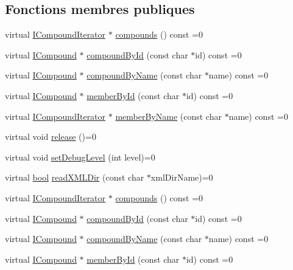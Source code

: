 \subsection*{Fonctions membres publiques}
\begin{DoxyCompactItemize}
\item 
virtual \hyperlink{class_i_compound_iterator}{I\+Compound\+Iterator} $\ast$ \hyperlink{class_i_doxygen_ad6bef278ea486b463323b2be87990a67}{compounds} () const  =0
\item 
virtual \hyperlink{class_i_compound}{I\+Compound} $\ast$ \hyperlink{class_i_doxygen_a797d66e139fe7638e27d917d97c9087c}{compound\+By\+Id} (const char $\ast$id) const  =0
\item 
virtual \hyperlink{class_i_compound}{I\+Compound} $\ast$ \hyperlink{class_i_doxygen_a0dbd98de15bb5cbb7c5952f245a13f9b}{compound\+By\+Name} (const char $\ast$name) const  =0
\item 
virtual \hyperlink{class_i_compound}{I\+Compound} $\ast$ \hyperlink{class_i_doxygen_acdc5189b5001911bc9f36cdc7a247617}{member\+By\+Id} (const char $\ast$id) const  =0
\item 
virtual \hyperlink{class_i_compound_iterator}{I\+Compound\+Iterator} $\ast$ \hyperlink{class_i_doxygen_af80f63c939655a2b1fa715f0ff6b1f39}{member\+By\+Name} (const char $\ast$name) const  =0
\item 
virtual void \hyperlink{class_i_doxygen_a6865961012ad8e6c19b7575488046045}{release} ()=0
\item 
virtual void \hyperlink{class_i_doxygen_ae8e3759ffc6d64684dc500855f6fead6}{set\+Debug\+Level} (int level)=0
\item 
virtual \hyperlink{qglobal_8h_a1062901a7428fdd9c7f180f5e01ea056}{bool} \hyperlink{class_i_doxygen_a7959d93fba77caddee37b6d8370c10f0}{read\+X\+M\+L\+Dir} (const char $\ast$xml\+Dir\+Name)=0
\item 
virtual \hyperlink{class_i_compound_iterator}{I\+Compound\+Iterator} $\ast$ \hyperlink{class_i_doxygen_ad6bef278ea486b463323b2be87990a67}{compounds} () const  =0
\item 
virtual \hyperlink{class_i_compound}{I\+Compound} $\ast$ \hyperlink{class_i_doxygen_a797d66e139fe7638e27d917d97c9087c}{compound\+By\+Id} (const char $\ast$id) const  =0
\item 
virtual \hyperlink{class_i_compound}{I\+Compound} $\ast$ \hyperlink{class_i_doxygen_a0dbd98de15bb5cbb7c5952f245a13f9b}{compound\+By\+Name} (const char $\ast$name) const  =0
\item 
virtual \hyperlink{class_i_compound}{I\+Compound} $\ast$ \hyperlink{class_i_doxygen_acdc5189b5001911bc9f36cdc7a247617}{member\+By\+Id} (const char $\ast$id) const  =0

\end{DoxyCompactItemize}
